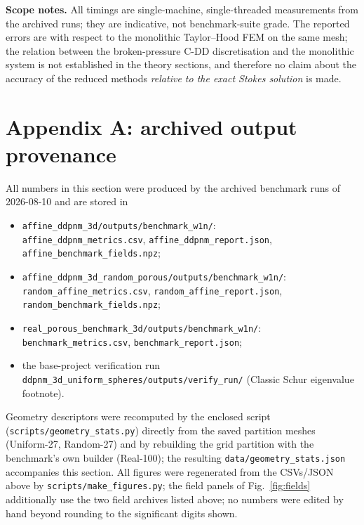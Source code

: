 \documentclass[11pt,a4paper]{article}
\begin{document}
\textbf{Scope notes.}  All timings are single-machine, single-threaded
measurements from the archived runs; they are indicative, not
benchmark-suite grade.  The reported errors are with respect to the
monolithic Taylor--Hood FEM on the same mesh; the relation between the
broken-pressure C-DD discretisation and the monolithic system is not
established in the theory sections, and therefore no claim about the
accuracy of the reduced methods \emph{relative to the exact Stokes
solution} is made.

\section*{Appendix A: archived output provenance}
\label{app:provenance}

All numbers in this section were produced by the archived benchmark
runs of 2026-08-10 and are stored in
\begin{itemize}[nosep,leftmargin=*]
\item \texttt{affine\_ddpnm\_3d/outputs/benchmark\_w1n/}:\\
  \texttt{affine\_ddpnm\_metrics.csv}, \texttt{affine\_ddpnm\_report.json},
  \texttt{affine\_benchmark\_fields.npz};
\item \texttt{affine\_ddpnm\_3d\_random\_porous/outputs/benchmark\_w1n/}:\\
  \texttt{random\_affine\_metrics.csv}, \texttt{random\_affine\_report.json},
  \texttt{random\_benchmark\_fields.npz};
\item \texttt{real\_porous\_benchmark\_3d/outputs/benchmark\_w1n/}:\\
  \texttt{benchmark\_metrics.csv}, \texttt{benchmark\_report.json};
\item the base-project verification run\\
  \texttt{ddpnm\_3d\_uniform\_spheres/outputs/verify\_run/} (Classic
  Schur eigenvalue footnote).
\end{itemize}
Geometry descriptors were recomputed by the enclosed script
(\texttt{scripts/geometry\_stats.py}) directly from the saved
partition meshes (Uniform-27, Random-27) and by rebuilding the grid
partition with the benchmark's own builder (Real-100); the resulting
\texttt{data/geometry\_stats.json} accompanies this section.  All
figures were regenerated from the CSVs/JSON above by
\texttt{scripts/make\_figures.py}; the field panels of
Fig.~\ref{fig:fields} additionally use the two field archives listed
above; no numbers were edited by hand beyond rounding to the
significant digits shown.
\end{document}
